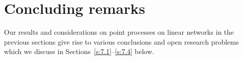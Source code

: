 \documentclass[alpha-refs]{wiley-article}
\begin{document}
\section{Concluding remarks}\label{s:conclusion}


Our results and considerations on point processes on linear networks in the previous sections give rise to various conclusions and open research problems which we discuss in Sections~\ref{s:7.1}--\ref{s:7.4} below.
\end{document}
